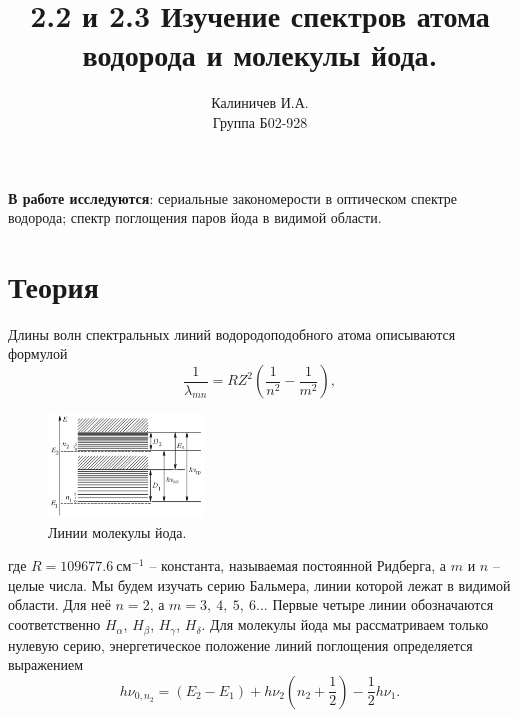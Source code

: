 \documentclass[a4paper,12pt]{article}
\author{Калиничев И.А.\\
Группа Б02-928}
\title{2.2 и 2.3 Изучение спектров атома водорода и молекулы йода.}
\date{\vspace{-10pt}}
\begin{document}
\maketitle
\textbf{В работе исследуются}: сериальные закономерости в оптическом спектре водорода; спектр поглощения паров йода в видимой области.
\section*{Теория}
Длины волн спектральных линий водородоподобного атома описываются формулой
\begin{equation}
\dfrac{1}{\lambda_{mn}} = RZ^2 \left( \dfrac{1}{n^2} - \dfrac{1}{m^2} \right),
\end{equation}
\begin{figure}
\includegraphics[width = 0.37\textwidth]{1.png}
\centering
\caption{Линии молекулы йода.}
\end{figure}
где $R = 109677.6~\text{см}^{-1}$ -- константа, называемая постоянной Ридберга, а $m$ и $n$ -- целые числа. Мы будем изучать серию Бальмера, линии которой лежат в видимой области. Для неё $n = 2$, а $m = 3,~4,~5,~6\dots$ Первые четыре линии обозначаются соответственно $H_\alpha$, $H_\beta$, $H_\gamma$, $H_\delta$.
Для молекулы йода мы рассматриваем только нулевую серию, энергетическое положение линий поглощения определяется выражением
\begin{equation}
h\nu_{0, n_2} = (E_2 - E_1) + h\nu_2 \left( n_2 + \dfrac{1}{2} \right) - \dfrac{1}{2} h \nu_1.
\end{equation}
\end{document}
